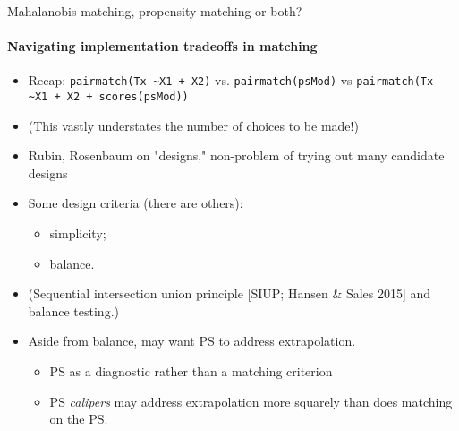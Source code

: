\begin{frame}{Mahalanobis matching, propensity matching or both?}
\framesubtitle{Navigating implementation tradeoffs in matching}
\begin{itemize}[<+->]
\item Recap: \texttt{pairmatch(Tx \textasciitilde X1 + X2)}
  vs. \texttt{pairmatch(psMod)} vs \texttt{pairmatch(Tx
    \textasciitilde X1 + X2 + scores(psMod))}
\item (This vastly understates the number of choices to be made!)
\item Rubin, Rosenbaum on "designs," non-problem of trying out many
  candidate designs 
\item Some design criteria (there are others):
  \begin{itemize}
  \item simplicity; 
\item balance.
  \end{itemize}
\item (Sequential intersection union principle [SIUP; Hansen \& Sales 2015]
  and balance testing.)
\item Aside from balance, may want PS to address extrapolation.
  \begin{itemize}
  \item PS as a diagnostic rather than a matching criterion
  \item PS \textit{calipers} may address extrapolation more squarely than
    does matching on the PS.
  \end{itemize}
\end{itemize}
\end{frame}

